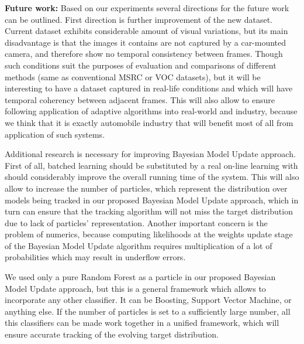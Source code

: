 {\bf Future work:} \quad Based on our experiments several directions for the future work can be outlined.
First direction is further improvement of the new dataset. Current dataset exhibits considerable amount of visual variations,
but its main disadvantage is that the images it contains are not captured by a car-mounted camera, and therefore show no temporal consistency between 
frames. Though such conditions suit the purposes of evaluation and comparisons of different methods (same as conventional MSRC or VOC datasets),
but it will be interesting to have a dataset captured in real-life conditions and which will have temporal coherency between adjacent frames. This
will also allow to ensure following application of adaptive algorithms into real-world and industry, because we think that it is exactly automobile
industry that will benefit most of all from application of such systems.

Additional research is necessary for improving Bayesian Model Update approach. First of all, batched learning should be substituted by a real on-line 
learning
with should considerably improve the overall running time of the system. This will also allow to increase the number of particles, which represent
the distribution over models being tracked  in our proposed Bayesian Model Update approach, which in turn can ensure that the tracking algorithm 
will not miss the target distribution due to lack of particles' representation. Another important concern is the problem of numerics, because computing
likelihoods at the weights update stage of the Bayesian Model Update algorithm requires multiplication of a lot of probabilities which may result in
underflow errors.

We used only a pure Random Forest as a particle in our proposed Bayesian Model Update approach, but this is a general framework which allows to 
incorporate any other classifier. It can be Boosting, Support Vector Machine, or anything else. If the number of particles is set to a sufficiently
large number, all this classifiers can be made work together in a unified framework, which will ensure accurate tracking of the evolving 
target distribution.
